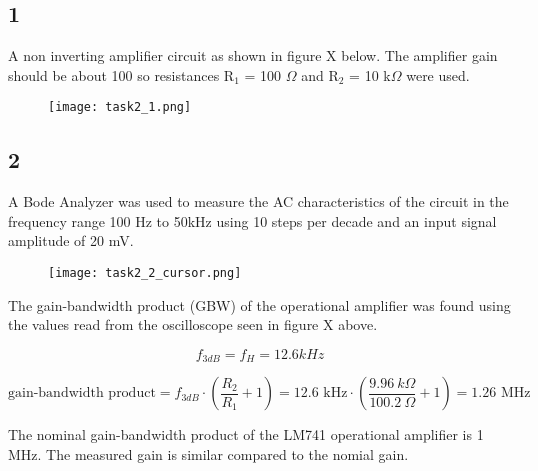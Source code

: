 \subsection*{1}

    A non inverting amplifier circuit as shown in figure X below. The amplifier gain should be about 100 so resistances R$_1$ = 100 $\Omega$ and R$_2$ = 10 k$\Omega$ were used.

    \begin{figure}[h!]
        \centering
        \texttt{[image: task2\_1.png]}
    \end{figure}

\subsection*{2}

    A Bode Analyzer was used to measure the AC characteristics of the circuit in the frequency range 100 Hz to 50kHz using 10 steps per decade and an input signal amplitude of 20 mV.\\

    \begin{figure}[h!]
        \centering
        \texttt{[image: task2\_2\_cursor.png]}
    \end{figure}

    The gain-bandwidth product (GBW) of the operational amplifier was found using the values read from the oscilloscope seen in figure X above.

    $$f_{3dB} = f_{H} = 12.6 kHz$$

    $$\text{gain-bandwidth product} = f_{3dB} \cdot (\frac{R_2}{R_1} + 1) = 12.6\text{ kHz} \cdot (\frac{9.96\ k \Omega}{100.2\ \Omega} + 1) = 1.26 \text{ MHz}$$

    The nominal gain-bandwidth product of the LM741 operational amplifier is 1 MHz. The measured gain is similar compared to the nomial gain.

